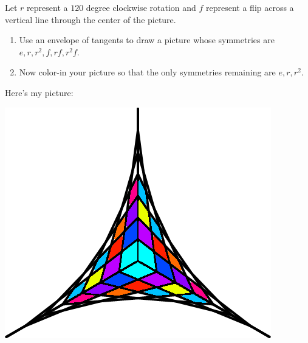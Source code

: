 \documentclass[noauthor,nooutcomes,12pt,hints]{ximera}
\begin{document}
\begin{question}
  Let $r$ represent a $120$ degree clockwise rotation and $f$
  represent a flip across a vertical line through the center of the
  picture.  
 \begin{enumerate}
 \item Use an envelope of tangents to draw a picture whose symmetries
   are $e,r,r^2,f,rf,r^2f$.
 \item Now color-in your picture so that the only symmetries remaining
   are $e,r,r^2$.
 \end{enumerate}
 \begin{freeResponse}
   Here's my picture:
   \begin{center}
     \includegraphics[width=.6\textwidth]{ansR3.png}
   \end{center}
 \end{freeResponse}
\end{question}
\mynewpage
\end{document}

